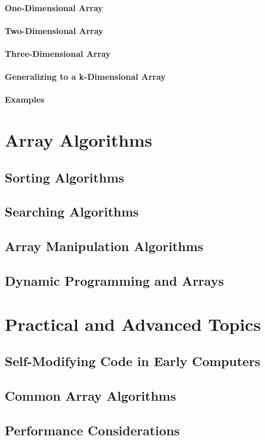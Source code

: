 \documentclass[12pt, oneside]{book}
\begin{document}
	\subsubsection{One-Dimensional Array}
	\subsubsection{Two-Dimensional Array}
	\subsubsection{Three-Dimensional Array}
	\subsubsection{Generalizing to a k-Dimensional Array}
	\subsubsection{Examples}
	\chapter{Array Algorithms}
	\section{Sorting Algorithms}
	\section{Searching Algorithms}
	\section{Array Manipulation Algorithms}
	\section{Dynamic Programming and Arrays}
	\chapter{Practical and Advanced Topics}
	\section{Self-Modifying Code in Early Computers}
	\section{Common Array Algorithms}
	\section{Performance Considerations}
\end{document}
